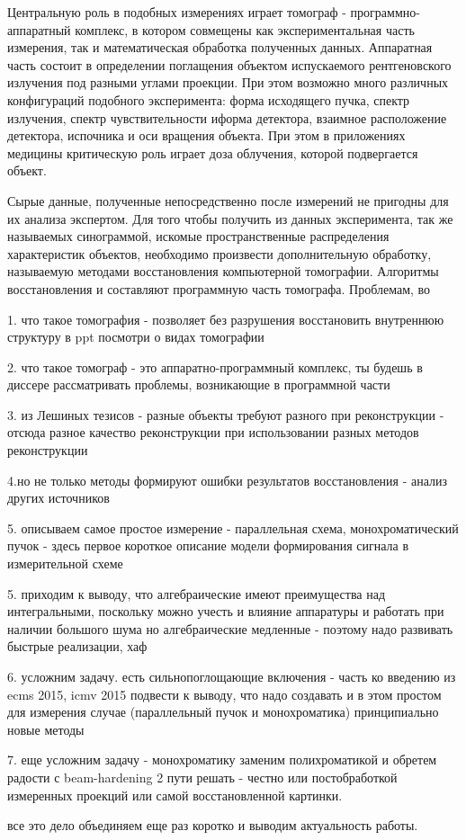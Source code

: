Центральную роль в подобных измерениях играет томограф - программно-аппаратный комплекс, в котором совмещены как экспериментальная часть измерения, так и математическая обработка полученных данных.
Аппаратная часть состоит в определении поглащения объектом испускаемого рентгеновского излучения под разными углами проекции.
При этом возможно много различных конфигураций подобного эксперимента: форма исходящего пучка, спектр излучения, спектр чувствительности иформа детектора, взаимное расположение детектора, испочника и оси вращения объекта.
При этом в приложениях медицины критическую роль играет доза облучения, которой подвергается объект.

Сырые данные, полученные непосредственно после измерений не пригодны для их анализа экспертом.
Для того чтобы получить из данных эксперимента, так же называемых синограммой, искомые пространственные распределения характеристик объектов, необходимо произвести дополнительную обработку, называемую методами восстановления компьютерной томографии.
Алгоритмы восстановления и составляют программную часть томографа. Проблемам, во



1. что такое томография - позволяет без разрушения восстановить внутреннюю структуру в ppt посмотри о видах томографии	

2. что такое томограф - это аппаратно-программный комплекс, ты будешь в диссере рассматривать проблемы, возникающие в программной части

\aim


3. из Лешиных тезисов - разные объекты требуют разного при реконструкции - отсюда разное качество реконструкции при использовании разных методов реконструкции

4.но не только методы формируют ошибки результатов восстановления - анализ других источников

5. описываем самое простое измерение - параллельная схема, монохроматический пучок - здесь первое короткое описание модели формирования сигнала в измерительной схеме

5. приходим к выводу, что алгебраические имеют преимущества над интегральными, поскольку можно учесть и влияние аппаратуры и работать при наличии большого шума
но алгебраические медленные - поэтому надо развивать быстрые реализации, хаф

6. усложним задачу. есть сильнопоглощающие включения - часть ко введению из ecms 2015, icmv 2015 подвести к выводу, что надо создавать и в этом простом для измерения случае (параллельный пучок и монохроматика) принципиально новые методы

7. еще усложним задачу - монохроматику заменим полихроматикой и обретем радости с beam-hardening 2 пути решать - честно или постобработкой измеренных проекций или самой восстановленной картинки.

все это дело объединяем еще раз коротко и выводим актуальность работы.
